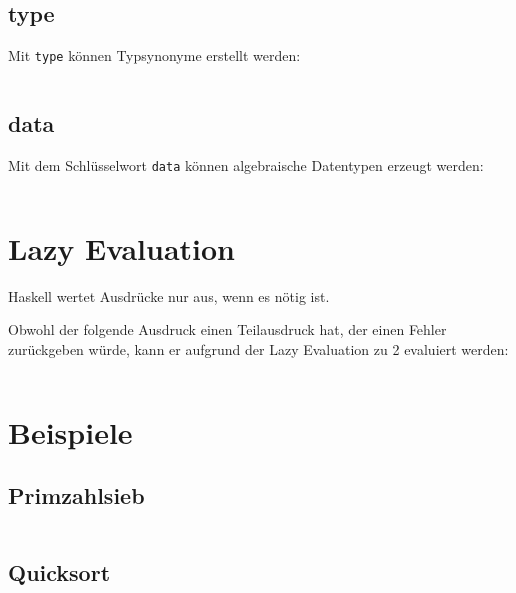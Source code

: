 \subsection{type}%
Mit \texttt{type} können Typsynonyme erstellt werden:

\inputminted[numbersep=5pt, tabsize=4]{haskell}{scripts/haskell/alt-types.hs}

\subsection{data}%
Mit dem Schlüsselwort \texttt{data} können algebraische Datentypen
erzeugt werden:

\inputminted[numbersep=5pt, tabsize=4]{haskell}{scripts/haskell/data-example.hs}

\section{Lazy Evaluation}%
Haskell wertet Ausdrücke nur aus, wenn es nötig ist.

\begin{beispiel}
    Obwohl der folgende Ausdruck einen Teilausdruck hat, der einen Fehler zurückgeben
    würde, kann er aufgrund der Lazy Evaluation zu 2 evaluiert werden:
    \inputminted[linenos, numbersep=5pt, tabsize=4, frame=lines, label=lazy-evaluation.hs]{haskell}{scripts/haskell/lazy-evaluation.hs}
\end{beispiel}

\section{Beispiele}

\subsection{Primzahlsieb}%
\inputminted[linenos, numbersep=5pt, tabsize=4, frame=lines, label=primzahlsieb.hs]{haskell}{scripts/haskell/primzahlsieb.hs}

\subsection{Quicksort}%
\inputminted[linenos, numbersep=5pt, tabsize=4, frame=lines, label=qsort.hs]{haskell}{scripts/haskell/qsort.hs}

